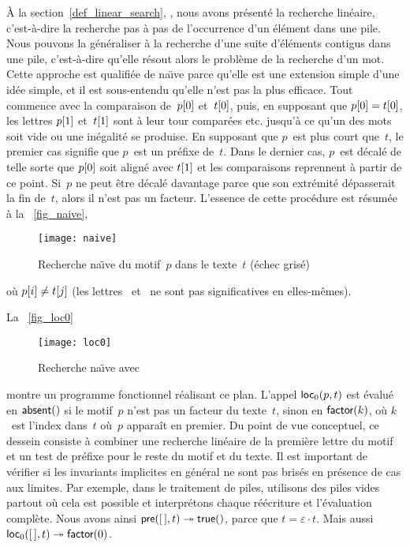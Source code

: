 À la section~\ref{def_linear_search}, ,
nous avons présenté la recherche linéaire,
c'est-à-dire la recherche pas à pas de l'occurrence d'un élément dans
une pile. Nous pouvons la généraliser à la recherche d'une suite
d'éléments contigus dans une pile, c'est-à-dire qu'elle résout alors
le problème de la recherche d'un mot. Cette approche est qualifiée de
na\"{\i}ve parce qu'elle est une extension simple d'une idée simple,
et il est sous-entendu qu'elle n'est pas la plus efficace. Tout
commence avec la comparaison de~\({p}[{0}]\) et~\({t}[{0}]\),
puis, en supposant que \({p}[{0}] = {t}[{0}]\), les lettres
\({p}[{1}]\) et~\({t}[{1}]\) sont à leur tour comparées etc.
jusqu'à ce qu'un des mots soit vide ou une inégalité se produise. En
supposant que \(p\)~est plus court que~\(t\), le premier cas signifie
que \(p\)~est un préfixe de~\(t\). Dans le dernier cas, \(p\)~est
décalé de telle sorte que \({p}[{0}]\) soit aligné avec
\({t}[{1}]\) et les comparaisons reprennent à partir de ce
point. Si~\(p\) ne peut être décalé davantage parce que son extrémité
dépasserait la fin de~\(t\), alors il n'est pas un facteur. L'essence
de cette procédure est résumée à la \fig~\vref{fig_naive},
\begin{figure}[t]
\centering
\texttt{[image: naive]}
\caption{Recherche na\"{\i}ve du motif~\(p\) dans le texte~\(t\) 
(échec grisé)\label{fig_naive}}
\end{figure}
où \({p}[{i}] \neq {t}[{j}]\) (les lettres ~et~ ne
sont pas significatives en elles-mêmes).

La \fig~\vref{fig_loc0}
\begin{figure}[t]
\centering 
\texttt{[image: loc0]}
\caption{Recherche na\"{\i}ve avec 
\label{fig_loc0}}
\end{figure}
montre un programme fonctionnel réalisant ce plan. L'appel
\(\textsf{loc}_0(p,t)\) est évalué en
\(\textsf{absent}()\) si le motif~\(p\) n'est pas un facteur du
texte~\(t\), sinon en \(\textsf{factor}(k)\), où \(k\)~est l'index
dans~\(t\) où~\(p\) apparaît en premier. Du point de vue conceptuel,
ce dessein consiste à combiner une recherche linéaire de la première
lettre du motif et un test de préfixe pour le reste du motif et du
texte. Il est important de vérifier si les invariants implicites en
général ne sont pas brisés en présence de cas aux limites. Par
exemple, dans le traitement de piles, utilisons des piles vides
partout où cela est possible et interprétons chaque réécriture et
l'évaluation complète. Nous avons ainsi \(\textsf{pre}([\,],t)
\twoheadrightarrow \textsf{true}()\), parce que \(t = \varepsilon \cdot
t\). Mais aussi \(\textsf{loc}_0([\,],t) \twoheadrightarrow \textsf{factor}(0)\).

